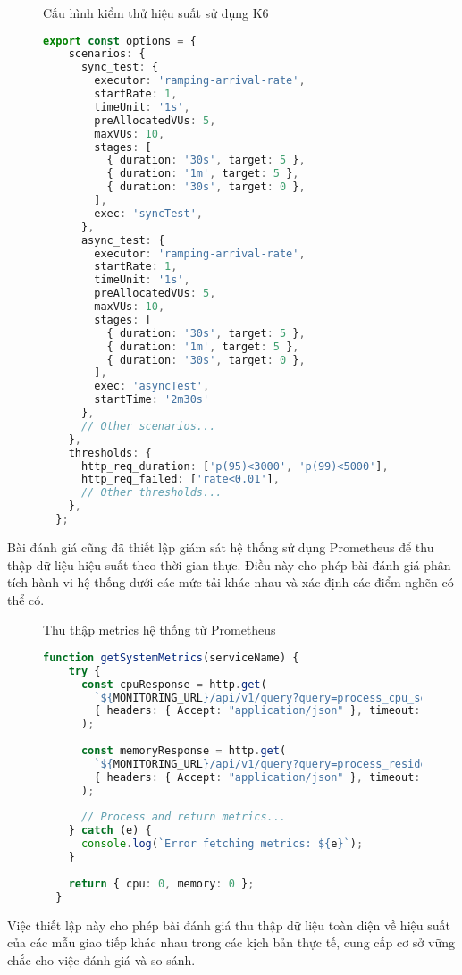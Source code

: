 \begin{figure}[H]{Cấu hình kiểm thử hiệu suất sử dụng K6}
  \centering
  \begin{minipage}{\textwidth}
    \begin{lstlisting}[language=Typescript, basicstyle=\scriptsize\ttfamily]
  export const options = {
    scenarios: {
      sync_test: {
        executor: 'ramping-arrival-rate',
        startRate: 1,
        timeUnit: '1s',
        preAllocatedVUs: 5,
        maxVUs: 10,
        stages: [
          { duration: '30s', target: 5 },
          { duration: '1m', target: 5 },
          { duration: '30s', target: 0 },
        ],
        exec: 'syncTest',
      },
      async_test: {
        executor: 'ramping-arrival-rate',
        startRate: 1,
        timeUnit: '1s',
        preAllocatedVUs: 5,
        maxVUs: 10,
        stages: [
          { duration: '30s', target: 5 },
          { duration: '1m', target: 5 },
          { duration: '30s', target: 0 },
        ],
        exec: 'asyncTest',
        startTime: '2m30s'
      },
      // Other scenarios...
    },
    thresholds: {
      http_req_duration: ['p(95)<3000', 'p(99)<5000'],
      http_req_failed: ['rate<0.01'],
      // Other thresholds...
    },
  };
  \end{lstlisting}
  \end{minipage}
\end{figure}

Bài đánh giá cũng đã thiết lập giám sát hệ thống sử dụng Prometheus để thu thập dữ liệu hiệu suất theo thời gian thực. Điều này cho phép bài đánh giá phân tích hành vi hệ thống dưới các mức tải khác nhau và xác định các điểm nghẽn có thể có.

\begin{figure}[H]{Thu thập metrics hệ thống từ Prometheus}
  \centering
  \begin{minipage}{\textwidth}
    \begin{lstlisting}[language=Typescript, basicstyle=\scriptsize\ttfamily]
  function getSystemMetrics(serviceName) {
    try {
      const cpuResponse = http.get(
        `${MONITORING_URL}/api/v1/query?query=process_cpu_seconds_total{service="${serviceName}"}`,
        { headers: { Accept: "application/json" }, timeout: "2s" }
      );
  
      const memoryResponse = http.get(
        `${MONITORING_URL}/api/v1/query?query=process_resident_memory_bytes{service="${serviceName}"}`,
        { headers: { Accept: "application/json" }, timeout: "2s" }
      );
  
      // Process and return metrics...
    } catch (e) {
      console.log(`Error fetching metrics: ${e}`);
    }
  
    return { cpu: 0, memory: 0 };
  }
  \end{lstlisting}
  \end{minipage}
\end{figure}

Việc thiết lập này cho phép bài đánh giá thu thập dữ liệu toàn diện về hiệu suất của các mẫu giao tiếp khác nhau trong các kịch bản thực tế, cung cấp cơ sở vững chắc cho việc đánh giá và so sánh.
